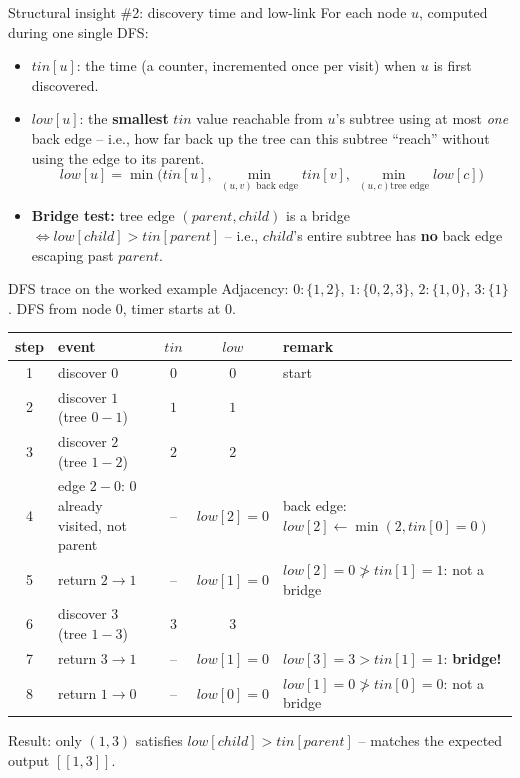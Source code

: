 \documentclass[11pt,aspectratio=169]{beamer}
\begin{document}
\begin{frame}{Structural insight \#2: discovery time and low-link}
  For each node $u$, computed during one single DFS:
  \begin{itemize}
    \item $tin[u]$: the time (a counter, incremented once per visit) when $u$ is first
    discovered.
    \item $low[u]$: the \textbf{smallest} $tin$ value reachable from $u$'s subtree using
    at most \emph{one} back edge -- i.e., how far back up the tree can this subtree
    ``reach'' without using the edge to its parent.
    \[
      low[u] = \min\Big(tin[u],\ \min_{(u,v)\text{ back edge}} tin[v],\ \min_{(u,c)\text{
      tree edge}} low[c]\Big)
    \]
    \item \textbf{Bridge test:} tree edge $(parent, child)$ is a bridge
    $\iff low[child] > tin[parent]$ -- i.e., $child$'s entire subtree has \textbf{no}
    back edge escaping past $parent$.
  \end{itemize}
\end{frame}

\begin{frame}{DFS trace on the worked example}
  \scriptsize
  Adjacency: $0\!:\!\{1,2\}$, $1\!:\!\{0,2,3\}$, $2\!:\!\{1,0\}$, $3\!:\!\{1\}$. DFS from
  node $0$, timer starts at $0$.
  \begin{center}
  \begin{tabular}{@{}c p{3.1cm} c c p{3.6cm}@{}}
    \toprule
    step & event & $tin$ & $low$ & remark \\
    \midrule
    1 & discover $0$ & $0$ & $0$ & start \\
    2 & discover $1$ (tree $0{-}1$) & $1$ & $1$ & \\
    3 & discover $2$ (tree $1{-}2$) & $2$ & $2$ & \\
    4 & edge $2{-}0$: $0$ already visited, not parent & -- & $low[2]{=}0$ & back edge:
    $low[2]\gets\min(2,tin[0]{=}0)$ \\
    5 & return $2\to1$ & -- & $low[1]{=}0$ & $low[2]{=}0 \not> tin[1]{=}1$: not a bridge \\
    6 & discover $3$ (tree $1{-}3$) & $3$ & $3$ & \\
    7 & return $3\to1$ & -- & $low[1]{=}0$ & $low[3]{=}3 > tin[1]{=}1$: \textbf{bridge!} \\
    8 & return $1\to0$ & -- & $low[0]{=}0$ & $low[1]{=}0 \not> tin[0]{=}0$: not a bridge \\
    \bottomrule
  \end{tabular}
  \end{center}
  Result: only $(1,3)$ satisfies $low[child] > tin[parent]$ -- matches the expected
  output $[[1,3]]$.
\end{frame}
\end{document}
